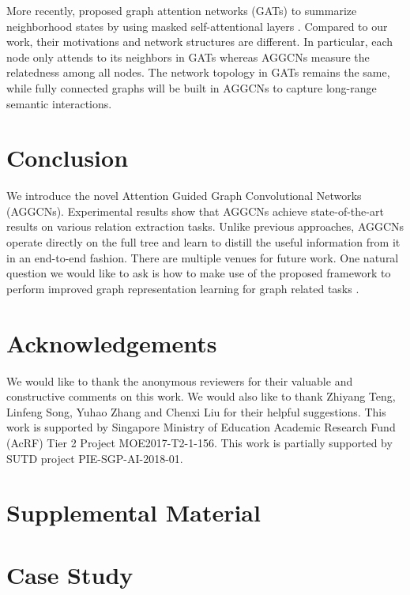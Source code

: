 \documentclass[11pt,a4paper]{article}
\begin{document}
More recently, \citet{Velickovic2017GraphAN} proposed graph attention networks (GATs) to summarize neighborhood states by using masked self-attentional layers \citep{Vaswani2017AttentionIA}. Compared to our work, their motivations and network structures are different. In particular, each node only attends to its neighbors in GATs whereas AGGCNs measure the relatedness among all nodes. The network topology in GATs remains the same, while fully connected graphs will be built in AGGCNs to capture long-range semantic interactions.



\section{Conclusion}

We introduce the novel Attention Guided Graph Convolutional Networks (AGGCNs). Experimental results show that AGGCNs achieve state-of-the-art results on various relation extraction tasks. Unlike previous approaches, AGGCNs operate directly on the full tree and learn to distill the useful information from it in an end-to-end fashion. There are multiple venues for future work. One natural question we would like to ask is how to make use of the proposed framework to perform improved graph representation learning for graph related tasks \citep{Bastings2017GraphCE}.


\section*{Acknowledgements}

We would like to thank the anonymous reviewers for their valuable and constructive comments on this work. We would
also like to thank Zhiyang Teng, Linfeng Song, Yuhao Zhang and Chenxi Liu for their helpful suggestions. 
This work is supported by Singapore Ministry of Education Academic Research Fund (AcRF) Tier 2 Project MOE2017-T2-1-156. This work is partially supported by SUTD project PIE-SGP-AI-2018-01.




\appendix
\clearpage

\section*{Supplemental Material}

\section{Case Study}
\label{sec:6}
\end{document}
